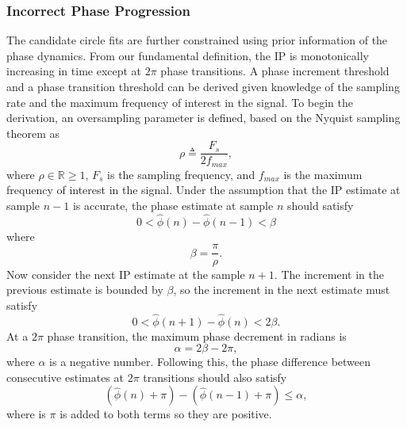 \documentclass[a4paper]{IEEEtran}
\begin{document}
\subsubsection{Incorrect Phase Progression}
The candidate circle fits are further constrained using prior information of the phase dynamics. From our fundamental definition, the IP is monotonically increasing in time except at $2\pi$ phase transitions. A phase increment threshold and a phase transition threshold can be derived given knowledge of the sampling rate and the maximum frequency of interest in the signal. To begin the derivation, an oversampling parameter is defined, based on the Nyquist sampling theorem as
\begin{equation}
	\rho\triangleq\frac{F_s}{2f_{max}},
\end{equation}
where $\rho \in \mathbb{R} \ge 1$, $F_s$ is the sampling frequency, and $f_{max}$ is the maximum frequency of interest in the signal. Under the assumption that the IP estimate at sample $n-1$ is accurate, the phase estimate at sample $n$ should satisfy
\begin{equation}
	0 < \hat\phi(n)-\hat\phi(n-1) < \beta
\end{equation}
where 
\begin{equation}
	\beta = \frac{\pi}{\rho}.
\end{equation}
Now consider the next IP estimate at the sample $n+1$. The increment in the previous estimate is bounded by $\beta$, so the increment in the next estimate must satisfy
\begin{equation}\label{eq:Prior1}
	0 < \hat\phi(n+1)-\hat\phi(n) < 2\beta.
\end{equation} 
At a $2\pi$ phase transition, the maximum phase decrement in radians is
\begin{equation}
	\alpha=2\beta-2\pi,
\end{equation}
where $\alpha$ is a negative number. Following this, the phase difference between consecutive estimates at $2\pi$ transitions should also satisfy
\begin{equation}\label{eq:Prior2}
(\hat{\phi} \left( n \right)+\pi) - (\hat{\phi} \left( n-1\right)+\pi) \le \alpha, 
\end{equation}
where is $\pi$ is added to both terms so they are positive.
\end{document}
